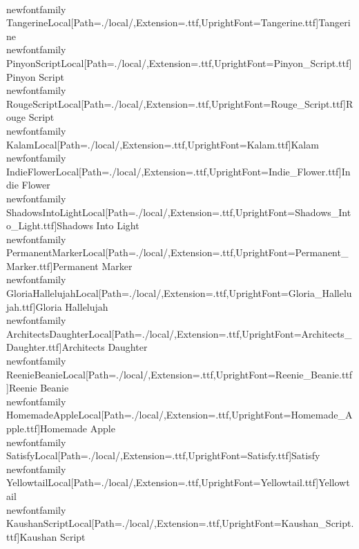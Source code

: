 \\newfontfamily\\TangerineLocal[Path=./local/,Extension=.ttf,UprightFont={Tangerine.ttf}]{Tangerine}
\\newfontfamily\\PinyonScriptLocal[Path=./local/,Extension=.ttf,UprightFont={Pinyon_Script.ttf}]{Pinyon Script}
\\newfontfamily\\RougeScriptLocal[Path=./local/,Extension=.ttf,UprightFont={Rouge_Script.ttf}]{Rouge Script}
\\newfontfamily\\KalamLocal[Path=./local/,Extension=.ttf,UprightFont={Kalam.ttf}]{Kalam}
\\newfontfamily\\IndieFlowerLocal[Path=./local/,Extension=.ttf,UprightFont={Indie_Flower.ttf}]{Indie Flower}
\\newfontfamily\\ShadowsIntoLightLocal[Path=./local/,Extension=.ttf,UprightFont={Shadows_Into_Light.ttf}]{Shadows Into Light}
\\newfontfamily\\PermanentMarkerLocal[Path=./local/,Extension=.ttf,UprightFont={Permanent_Marker.ttf}]{Permanent Marker}
\\newfontfamily\\GloriaHallelujahLocal[Path=./local/,Extension=.ttf,UprightFont={Gloria_Hallelujah.ttf}]{Gloria Hallelujah}
\\newfontfamily\\ArchitectsDaughterLocal[Path=./local/,Extension=.ttf,UprightFont={Architects_Daughter.ttf}]{Architects Daughter}
\\newfontfamily\\ReenieBeanieLocal[Path=./local/,Extension=.ttf,UprightFont={Reenie_Beanie.ttf}]{Reenie Beanie}
\\newfontfamily\\HomemadeAppleLocal[Path=./local/,Extension=.ttf,UprightFont={Homemade_Apple.ttf}]{Homemade Apple}
\\newfontfamily\\SatisfyLocal[Path=./local/,Extension=.ttf,UprightFont={Satisfy.ttf}]{Satisfy}
\\newfontfamily\\YellowtailLocal[Path=./local/,Extension=.ttf,UprightFont={Yellowtail.ttf}]{Yellowtail}
\\newfontfamily\\KaushanScriptLocal[Path=./local/,Extension=.ttf,UprightFont={Kaushan_Script.ttf}]{Kaushan Script}
